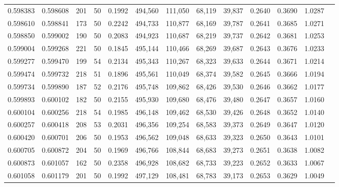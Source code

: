 \begin{tabular}{rrrrrrrrrrrrr}
0.598383 & 0.598608 &   201 &  50 &                                     0.1992 & 494,560 & 111,050 &  68,119 &  39,837 & 0.2640 & 0.3690 & 1.0287 \\
0.598610 & 0.598841 &   173 &  50 &                                     0.2242 & 494,733 & 110,877 &  68,169 &  39,787 & 0.2641 & 0.3685 & 1.0271 \\
0.598850 & 0.599002 &   190 &  50 &                                     0.2083 & 494,923 & 110,687 &  68,219 &  39,737 & 0.2642 & 0.3681 & 1.0253 \\
0.599004 & 0.599268 &   221 &  50 &                                     0.1845 & 495,144 & 110,466 &  68,269 &  39,687 & 0.2643 & 0.3676 & 1.0233 \\
0.599277 & 0.599470 &   199 &  54 &                                     0.2134 & 495,343 & 110,267 &  68,323 &  39,633 & 0.2644 & 0.3671 & 1.0214 \\
0.599474 & 0.599732 &   218 &  51 &                                     0.1896 & 495,561 & 110,049 &  68,374 &  39,582 & 0.2645 & 0.3666 & 1.0194 \\
0.599734 & 0.599890 &   187 &  52 &                                     0.2176 & 495,748 & 109,862 &  68,426 &  39,530 & 0.2646 & 0.3662 & 1.0177 \\
0.599893 & 0.600102 &   182 &  50 &                                     0.2155 & 495,930 & 109,680 &  68,476 &  39,480 & 0.2647 & 0.3657 & 1.0160 \\
0.600104 & 0.600256 &   218 &  54 &                                     0.1985 & 496,148 & 109,462 &  68,530 &  39,426 & 0.2648 & 0.3652 & 1.0140 \\
0.600257 & 0.600418 &   208 &  53 &                                     0.2031 & 496,356 & 109,254 &  68,583 &  39,373 & 0.2649 & 0.3647 & 1.0120 \\
0.600420 & 0.600701 &   206 &  50 &                                     0.1953 & 496,562 & 109,048 &  68,633 &  39,323 & 0.2650 & 0.3643 & 1.0101 \\
0.600705 & 0.600872 &   204 &  50 &                                     0.1969 & 496,766 & 108,844 &  68,683 &  39,273 & 0.2651 & 0.3638 & 1.0082 \\
0.600873 & 0.601057 &   162 &  50 &                                     0.2358 & 496,928 & 108,682 &  68,733 &  39,223 & 0.2652 & 0.3633 & 1.0067 \\
0.601058 & 0.601179 &   201 &  50 &                                     0.1992 & 497,129 & 108,481 &  68,783 &  39,173 & 0.2653 & 0.3629 & 1.0049 \\

\end{tabular}

